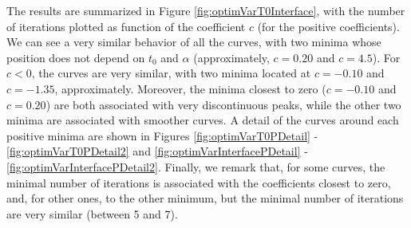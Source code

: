 \indent The results are summarized in Figure \ref{fig:optimVarT0Interface}, with the number of iterations plotted as function of the coefficient $c$ (for the positive coefficients). We can see a very similar behavior of all the curves, with two minima whose position does not depend on $t_0$ and $\alpha$ (approximately, $c = 0.20$ and $c=4.5$). For $c<0$, the curves are very similar, with two minima located at $c = -0.10$ and $c = -1.35$, approximately. Moreover, the minima closest to zero ($c=-0.10$ and $c = 0.20$) are both associated with very discontinuous peaks, while the other two minima are associated with smoother curves. A detail of the curves around each positive minima are shown in Figures \ref{fig:optimVarT0PDetail} - \ref{fig:optimVarT0PDetail2} and \ref{fig:optimVarInterfacePDetail} - \ref{fig:optimVarInterfacePDetail2}. Finally, we remark that, for some curves, the minimal number of iterations is associated with the coefficients closest to zero, and, for other ones, to the other minimum, but the minimal number of iterations are very similar (between 5 and 7).

